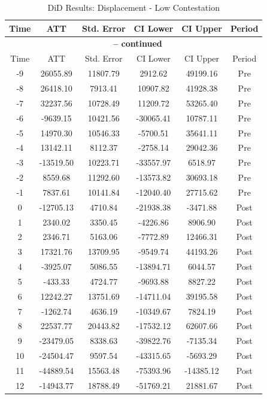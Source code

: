 \documentclass[bibtex]{article}
\begin{document}
{\begin{longtable}{cccccc}
\caption{DiD Results: Displacement - Low Contestation} \label{tab:idp_low} \\
\toprule
Time & ATT & Std. Error & CI Lower & CI Upper & Period \\
\midrule
\endfirsthead
\multicolumn{6}{c}{{\bfseries \tablename\ \thetable{} -- continued}} \\
\toprule
Time & ATT & Std. Error & CI Lower & CI Upper & Period \\
\midrule
\endhead
-9 & 26055.89 & 11807.79 & 2912.62 & 49199.16 & Pre \\
-8 & 26418.10 & 7913.41 & 10907.82 & 41928.38 & Pre \\
-7 & 32237.56 & 10728.49 & 11209.72 & 53265.40 & Pre \\
-6 & -9639.15 & 10421.56 & -30065.41 & 10787.11 & Pre \\
-5 & 14970.30 & 10546.33 & -5700.51 & 35641.11 & Pre \\
-4 & 13142.11 & 8112.37 & -2758.14 & 29042.36 & Pre \\
-3 & -13519.50 & 10223.71 & -33557.97 & 6518.97 & Pre \\
-2 & 8559.68 & 11292.60 & -13573.82 & 30693.18 & Pre \\
-1 & 7837.61 & 10141.84 & -12040.40 & 27715.62 & Pre \\
0 & -12705.13 & 4710.84 & -21938.38 & -3471.88 & Post \\
1 & 2340.02 & 3350.45 & -4226.86 & 8906.90 & Post \\
2 & 2346.71 & 5163.06 & -7772.89 & 12466.31 & Post \\
3 & 17321.76 & 13709.95 & -9549.74 & 44193.26 & Post \\
4 & -3925.07 & 5086.55 & -13894.71 & 6044.57 & Post \\
5 & -433.33 & 4724.77 & -9693.88 & 8827.22 & Post \\
6 & 12242.27 & 13751.69 & -14711.04 & 39195.58 & Post \\
7 & -1262.74 & 4636.19 & -10349.67 & 7824.19 & Post \\
8 & 22537.77 & 20443.82 & -17532.12 & 62607.66 & Post \\
9 & -23479.05 & 8338.63 & -39822.76 & -7135.34 & Post \\
10 & -24504.47 & 9597.54 & -43315.65 & -5693.29 & Post \\
11 & -44889.54 & 15563.48 & -75393.96 & -14385.12 & Post \\
12 & -14943.77 & 18788.49 & -51769.21 & 21881.67 & Post \\

\end{longtable}}
\end{document}

